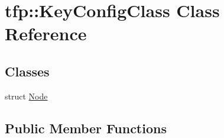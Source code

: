 \hypertarget{classtfp_1_1_key_config_class}{}\section{tfp\+:\+:Key\+Config\+Class Class Reference}
\label{classtfp_1_1_key_config_class}
\subsection*{Classes}
\begin{DoxyCompactItemize}
\item 
struct \mbox{\hyperlink{structtfp_1_1_key_config_class_1_1_node}{Node}}
\end{DoxyCompactItemize}
\subsection*{Public Member Functions}
